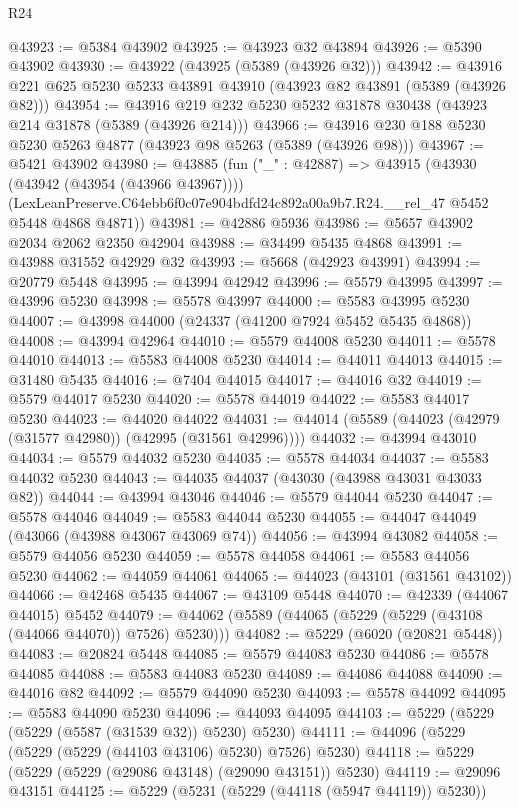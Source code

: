 \begin{lexlean}{R24}
\begin{coremodule}
@43923 := @5384 @43902
@43925 := @43923 @32 @43894
@43926 := @5390 @43902
@43930 := @43922 (@43925 (@5389 (@43926 @32)))
@43942 := @43916 @221 @625 @5230 @5233 @43891 @43910 (@43923 @82 @43891 (@5389 (@43926 @82)))
@43954 := @43916 @219 @232 @5230 @5232 @31878 @30438 (@43923 @214 @31878 (@5389 (@43926 @214)))
@43966 := @43916 @230 @188 @5230 @5230 @5263 @4877 (@43923 @98 @5263 (@5389 (@43926 @98)))
@43967 := @5421 @43902
@43980 := @43885
    (fun ("_" : @42887) =>
    @43915
      (@43930 (@43942 (@43954 (@43966 @43967))))
      (LexLeanPreserve.C64ebb6f0c07e904bdfd24c892a00a9b7.R24.__rel_47 @5452 @5448 @4868 @4871))
@43981 := @42886 @5936
@43986 := @5657 @43902 @2034 @2062 @2350 @42904
@43988 := @34499 @5435 @4868
@43991 := @43988 @31552 @42929 @32
@43993 := @5668 (@42923 @43991)
@43994 := @20779 @5448
@43995 := @43994 @42942
@43996 := @5579 @43995
@43997 := @43996 @5230
@43998 := @5578 @43997
@44000 := @5583 @43995 @5230
@44007 := @43998 @44000 (@24337 (@41200 @7924 @5452 @5435 @4868))
@44008 := @43994 @42964
@44010 := @5579 @44008 @5230
@44011 := @5578 @44010
@44013 := @5583 @44008 @5230
@44014 := @44011 @44013
@44015 := @31480 @5435
@44016 := @7404 @44015
@44017 := @44016 @32
@44019 := @5579 @44017 @5230
@44020 := @5578 @44019
@44022 := @5583 @44017 @5230
@44023 := @44020 @44022
@44031 := @44014 (@5589 (@44023 (@42979 (@31577 @42980)) (@42995 (@31561 @42996))))
@44032 := @43994 @43010
@44034 := @5579 @44032 @5230
@44035 := @5578 @44034
@44037 := @5583 @44032 @5230
@44043 := @44035 @44037 (@43030 (@43988 @43031 @43033 @82))
@44044 := @43994 @43046
@44046 := @5579 @44044 @5230
@44047 := @5578 @44046
@44049 := @5583 @44044 @5230
@44055 := @44047 @44049 (@43066 (@43988 @43067 @43069 @74))
@44056 := @43994 @43082
@44058 := @5579 @44056 @5230
@44059 := @5578 @44058
@44061 := @5583 @44056 @5230
@44062 := @44059 @44061
@44065 := @44023 (@43101 (@31561 @43102))
@44066 := @42468 @5435
@44067 := @43109 @5448
@44070 := @42339 (@44067 @44015) @5452
@44079 := @44062 (@5589 (@44065 (@5229 (@5229 (@43108 (@44066 @44070)) @7526) @5230)))
@44082 := @5229 (@6020 (@20821 @5448))
@44083 := @20824 @5448
@44085 := @5579 @44083 @5230
@44086 := @5578 @44085
@44088 := @5583 @44083 @5230
@44089 := @44086 @44088
@44090 := @44016 @82
@44092 := @5579 @44090 @5230
@44093 := @5578 @44092
@44095 := @5583 @44090 @5230
@44096 := @44093 @44095
@44103 := @5229 (@5229 (@5229 (@5587 (@31539 @32)) @5230) @5230)
@44111 := @44096 (@5229 (@5229 (@5229 (@44103 @43106) @5230) @7526) @5230)
@44118 := @5229 (@5229 (@5229 (@29086 @43148) (@29090 @43151)) @5230)
@44119 := @29096 @43151
@44125 := @5229 (@5231 (@5229 (@44118 (@5947 @44119)) @5230))

\end{coremodule}
\end{lexlean}
